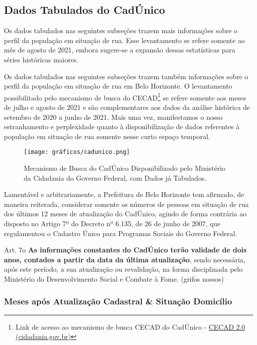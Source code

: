 \documentclass[12pt]{article}
\begin{document}
\subsection{Dados Tabulados do CadÚnico}

Os dados tabulados nas seguintes subseções trazem mais informações sobre o perfil da população em situação de rua. Esse levantamento se refere somente ao mês de agosto de 2021, embora sugere-se a expansão dessas estatísticas para séries históricas maiores. 

Os dados tabulados nas seguintes subseções trazem também informações sobre o perfil da população em situação de rua em Belo Horizonte. O levantamento possibilitado pelo mecanismo de busca do CECAD\footnote{Link de acesso ao mecanismo de busca CECAD do CadÚnico - \href{https://cecad.cidadania.gov.br/tab_cad.php}{CECAD 2.0 (cidadania.gov.br)}} se refere somente aos meses de julho e agosto de 2021 e são complementares aos dados da análise histórica de setembro de 2020 a junho de 2021. Mais uma vez, manifestamos o nosso estranhamento e perplexidade quanto à disponibilização de dados referentes à população em situação de rua somente nesse curto espaço temporal.\\

\begin{figure}[H]
\centering
	\caption{Mecanismo de Busca do CadÚnico Disponibilizado pelo Ministério da Cidadania do Governo Federal, com Dados já Tabulados.}
	\texttt{[image: gráficos/cadunico.png]}
	\label{fig:cadunico_web}
\end{figure}

Lamentável e arbitrariamente, a Prefeitura de Belo Horizonte tem afirmado, de maneira reiterada, considerar somente os números de pessoas em situação de rua dos últimos 12 meses de atualização do CadÚnico, agindo de forma contrária ao disposto no Artigo 7º do Decreto nº 6.135, de 26 de junho de 2007, que regulamentou o Cadastro Único para Programas Sociais do Governo Federal.

\begin{trivlist}\leftskip=2.5cm
\item Art. 7o  \textbf{As informações constantes do CadÚnico terão validade de dois anos, contados a partir da data da última atualização}, sendo necessária, após este período, a sua atualização ou revalidação, na forma disciplinada pelo Ministério do Desenvolvimento Social e Combate à Fome. (grifos nossos)
\end{trivlist}


\subsubsection{Meses após Atualização Cadastral \& Situação Domicílio}
\label{atualizacao_cadastral}
\end{document}
